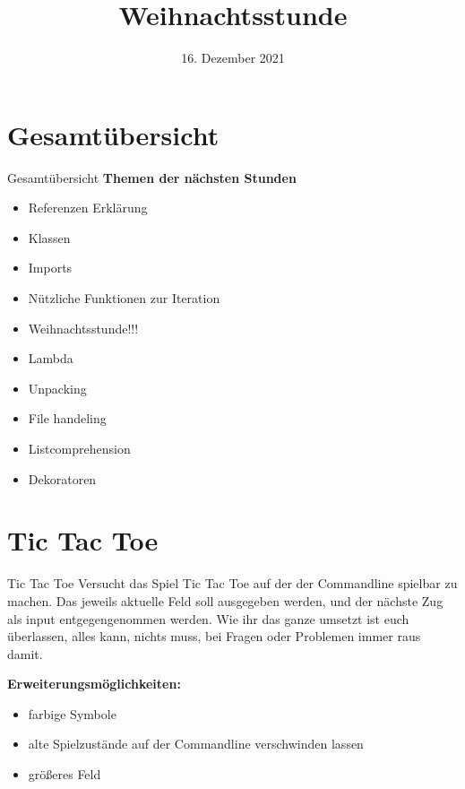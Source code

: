 



\title{Weihnachtsstunde}
\date{16. Dezember 2021}


	
\maketitle

\section*{Gesamtübersicht}
\begin{frame}{Gesamtübersicht}
	\textbf{Themen der nächsten Stunden}
	\begin{itemize}
		\item Referenzen Erklärung
		\item  Klassen
		\item Imports
		\item Nützliche Funktionen zur Iteration
		\item \alert{\Large{Weihnachtsstunde!!!}}
		\item Lambda
		\item Unpacking
		\item File handeling
		\item Listcomprehension
		\item Dekoratoren
	\end{itemize}
\end{frame}

\section{Tic Tac Toe}

\begin{frame}{Tic Tac Toe}
	Versucht das Spiel Tic Tac Toe auf der der Commandline spielbar zu machen. Das jeweils aktuelle Feld soll ausgegeben werden, und der nächste Zug als input entgegengenommen werden. Wie ihr das ganze umsetzt ist euch überlassen, alles kann, nichts muss, bei Fragen oder Problemen immer raus damit.\linebreak
	
	\textbf{Erweiterungsmöglichkeiten:}
	\begin{itemize}
		\item farbige Symbole
		\item alte Spielzustände auf der Commandline verschwinden lassen
		\item größeres Feld
	\end{itemize}
	
\end{frame}


